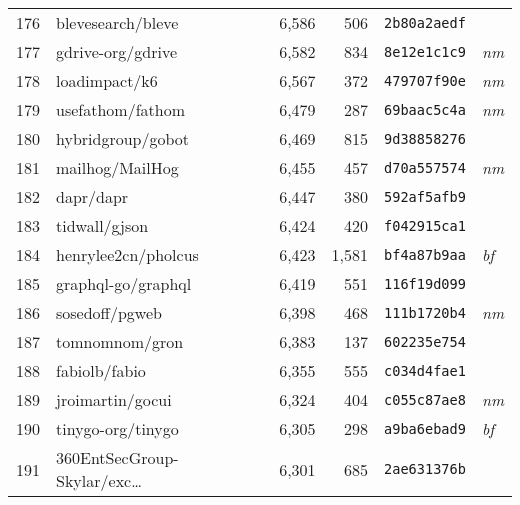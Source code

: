 {\begin{supertabular}{llrrll}
        176 &                  blevesearch/bleve &  6,586 &    506 &  \texttt{2b80a2aedf} &              \\
        177 &                  gdrive-org/gdrive &  6,582 &    834 &  \texttt{8e12e1c1c9} &  \textit{nm} \\
        178 &                      loadimpact/k6 &  6,567 &    372 &  \texttt{479707f90e} &  \textit{nm} \\
        179 &                   usefathom/fathom &  6,479 &    287 &  \texttt{69baac5c4a} &  \textit{nm} \\
        180 &                  hybridgroup/gobot &  6,469 &    815 &  \texttt{9d38858276} &              \\
        181 &                    mailhog/MailHog &  6,455 &    457 &  \texttt{d70a557574} &  \textit{nm} \\
        182 &                          dapr/dapr &  6,447 &    380 &  \texttt{592af5afb9} &              \\
        183 &                      tidwall/gjson &  6,424 &    420 &  \texttt{f042915ca1} &              \\
        184 &                henrylee2cn/pholcus &  6,423 &  1,581 &  \texttt{bf4a87b9aa} &  \textit{bf} \\
        185 &                 graphql-go/graphql &  6,419 &    551 &  \texttt{116f19d099} &              \\
        186 &                     sosedoff/pgweb &  6,398 &    468 &  \texttt{111b1720b4} &  \textit{nm} \\
        187 &                     tomnomnom/gron &  6,383 &    137 &  \texttt{602235e754} &              \\
        188 &                      fabiolb/fabio &  6,355 &    555 &  \texttt{c034d4fae1} &              \\
        189 &                   jroimartin/gocui &  6,324 &    404 &  \texttt{c055c87ae8} &  \textit{nm} \\
        190 &                  tinygo-org/tinygo &  6,305 &    298 &  \texttt{a9ba6ebad9} &  \textit{bf} \\
        191 &    360EntSecGroup-Skylar/exc\ldots &  6,301 &    685 &  \texttt{2ae631376b} &              \\

\end{supertabular}}
